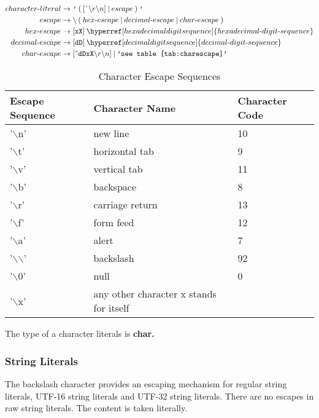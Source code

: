\documentclass[a4paper,oneside,11pt]{article}
\begin{document}
\begin{align*}
character\textrm{-}literal &\rightarrow \texttt{'} \> ( \> [\> \hat{}\> \backslash r \backslash n] \> | \> escape \>) \> \texttt{'}\\
escape &\rightarrow \backslash \> ( \> hex\textrm{-}escape \> | \> decimal\textrm{-}escape \> | \> char\textrm{-}escape \>)\\
hex\textrm{-}escape &\rightarrow [\texttt{xX}] \> \hyperref[hexadecimaldigitsequence]{hexadecimal\textrm{-}digit\textrm{-}sequence}\\
decimal\textrm{-}escape & \rightarrow [\texttt{dD}] \> \hyperref[decimaldigitsequence]{decimal\textrm{-}digit\textrm{-}sequence}\\
char\textrm{-}escape &\rightarrow [\> \hat{}\> \texttt{dDxX} \backslash r \backslash n] \> | \> \texttt{'see table \ref{tab:charescape}'}
\end{align*}

\begin{table}[htb]
\caption{Character Escape Sequences}\label{tab:charescape}
\begin{tabular}{lll}
\textbf{Escape Sequence }& \textbf{Character Name} & \textbf{Character Code}\\
\hline
'$\backslash$n' & new line& 10\\
'$\backslash$t' & horizontal tab& 9\\
'$\backslash$v' & vertical tab& 11\\
'$\backslash$b' & backspace & 8\\
'$\backslash$r' & carriage return & 13\\
'$\backslash$f' & form feed & 12\\
'$\backslash$a' & alert & 7\\
'$\backslash$$\backslash$' & backslash & 92\\
'$\backslash$0' & null & 0\\
'$\backslash$x' & any other character x stands for itself
\end{tabular}
\end{table}
The type of a character literals is \bf{char}.

\subsubsection{String Literals}\label{stringliteral}

The backslash character provides an escaping mechanism for regular string literals, UTF-16 string literals and UTF-32 string literals.
There are no escapes in raw string literals. The content is taken literally.
\end{document}
